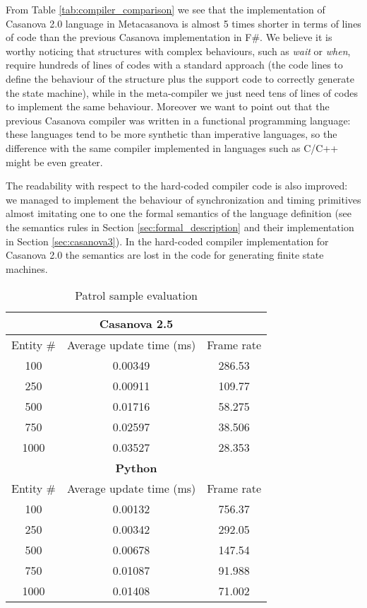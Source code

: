 From Table \ref{tab:compiler_comparison} we see that the implementation of Casanova 2.0 language in Metacasanova is almost 5 times shorter in terms of lines of code than the previous Casanova implementation in F\#. We believe it is worthy noticing that structures with complex behaviours, such as \textit{wait} or \textit{when}, require hundreds of lines of codes with a standard approach (the code lines to define the behaviour of the structure plus the support code to correctly generate the state machine), while in the meta-compiler we just need tens of lines of codes to implement the same behaviour. Moreover we want to point out that the previous Casanova compiler was written in a functional programming language: these languages tend to be more synthetic than imperative languages, so the difference with the same compiler implemented in languages such as C/C++ might be even greater.

The readability with respect to the hard-coded compiler code is also improved: we managed to implement the behaviour of synchronization and timing primitives almost imitating one to one the formal semantics of the language definition (see the semantics rules in Section \ref{sec:formal_description} and their implementation in Section \ref{sec:casanova3}). In the hard-coded compiler implementation for Casanova 2.0 the semantics are lost in the code for generating finite state machines.

\begin{table}
	\centering
	\tiny	
	\begin{tabular}{|c|c|c|}
		\hline
		\multicolumn{3}{|c|}{\textbf{Casanova 2.5}} \\
		\hline
		Entity \# & Average update time (ms) & Frame rate \\
		\hline
		100 & 0.00349 & 286.53 \\
		\hline
		250 & 0.00911 & 109.77 \\
		\hline
		500 & 0.01716 & 58.275 \\
		\hline
		750 & 0.02597 & 38.506 \\
		\hline
		1000 & 0.03527 & 28.353 \\
		\hline
		\multicolumn{3}{|c|}{\textbf{Python}} \\
		\hline
		Entity \# & Average update time (ms) & Frame rate \\
		\hline
		100 & 0.00132 & 756.37 \\
		\hline
		250 & 0.00342 & 292.05 \\
		\hline
		500 & 0.00678 & 147.54 \\
		\hline
		750 & 0.01087 & 91.988 \\
		\hline
		1000 & 0.01408 & 71.002 \\
		\hline
	\end{tabular}
	\caption{Patrol sample evaluation}
	\label{tab:evaluation}
\end{table}

